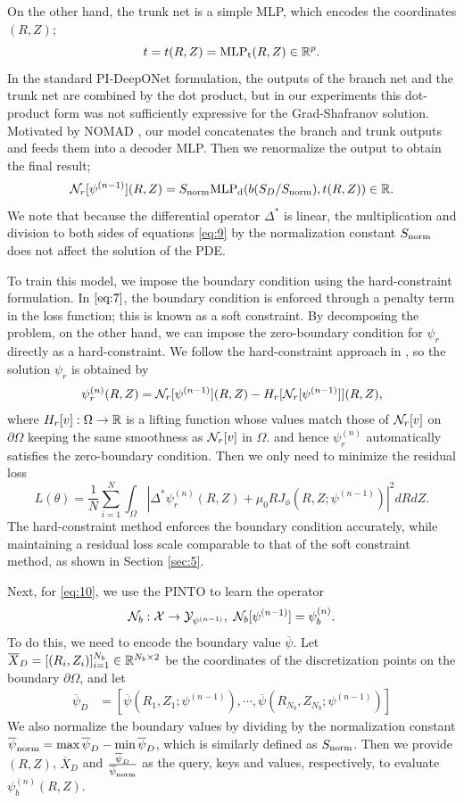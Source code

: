 On the other hand, the trunk net is a simple MLP, which encodes the coordinates $(R, Z)$;
\[ t = t(R, Z) =\te{MLP}_\te{t}(R, Z) \in \bb{R}^p. \]
In the standard PI-DeepONet formulation, the outputs of the branch net and the trunk net are
combined by the dot product, but in our experiments this dot-product form was not
sufficiently expressive for the Grad-Shafranov solution.
Motivated by NOMAD \cite{NOMAD}, our model concatenates the branch and trunk outputs 
and feeds them into a decoder MLP.
Then we renormalize the output to obtain the final result; 
\[ \cal{N}_r[\psi^{(n-1)}](R, Z) = S_{\te{norm}}\te{MLP}_{\te{d}}
(b(S_D / S_{\te{norm}}), t(R, Z)) \in \bb{R}. \]
We note that because the differential operator $\Delta^*$ is linear, 
the multiplication and division to both sides of equations \eqref{eq:9} 
by the normalization constant $S_{\te{norm}}$ does not affect the solution of the PDE.

To train this model, we impose the boundary condition using the hard-constraint formulation.
In $\eqref{eq:7}$, the boundary condition is enforced through a penalty term in the loss function;
this is known as a soft constraint. 
By decomposing the problem, on the other hand, we can impose the zero-boundary condition
for $\psi_r$ directly as a hard-constraint. 
We follow the hard-constraint approach in \cite{hardbdry}, so the solution 
$\psi_r$ is obtained by
\begin{align*}
  \psi_r^{(n)}(R, Z) = \cal{N}_r[\psi^{(n-1)}](R, Z) - H_r[\cal{N}_r[\psi^{(n-1)}]](R, Z),
\end{align*}
where $H_r[v]: \Omega \to \bb{R}$ is a lifting function whose values match
those of $\cal{N}_r[v]$ on $\partial \Omega$ keeping the same smoothness as $\cal{N}_r[v]$ in $\Omega$.
and hence $\psi_r^{(n)}$ automatically satisfies the zero-boundary condition. 
Then we only need to minimize the residual loss
\[ L(\theta) = \frac{1}{N}\sum_{i=1}^N \int_\Omega |\Delta^* \psi_r^{(n)}(R, Z)+ \mu_0 R J_\phi(R, Z; \psi^{(n-1)})|^2 dR dZ. \]
The hard-constraint method enforces the boundary condition accurately, 
while maintaining a residual loss scale comparable to that of the soft constraint method,
as shown in Section \ref{sec:5}.

Next, for \eqref{eq:10}, we use the PINTO to learn the operator
\[ \cal{N}_b: \cal{X} \to \cal{Y}_{\psi^{(n-1)}}, \ \cal{N}_b [\psi^{(n-1)}] = \psi_b^{(n)}. \]
To do this, we need to encode the boundary value $\overline{\psi}$.
Let $\overline{X}_D = [(R_{i}, Z_{i})]_{i=1}^{N_b} \in \bb{R}^{N_b \times 2}$ 
be the coordinates of the discretization points 
on the boundary $\partial \Omega$, and let 
\begin{align*}
  \overline{\psi}_{D} &= \left[
  \overline{\psi}(R_{1}, Z_{1}; \psi^{(n-1)}), \cdots, 
  \overline{\psi}(R_{N_b}, Z_{N_b}; \psi^{(n-1)}) \right]
\end{align*}
We also normalize the boundary values by dividing by the normalization constant 
$\overline{\psi}_{\te{norm}}=\max \overline{\psi}_D - \min \overline{\psi}_D$, 
which is similarly defined as $S_{\te{norm}}$.
Then we provide $(R, Z)$, $\overline{X}_{D}$ 
and $\frac{\overline{\psi}_{D}}{\overline{\psi}_{\te{norm}}}$ 
as the query, keys and values, respectively, to evaluate $\psi_b^{(n)}(R, Z)$.

